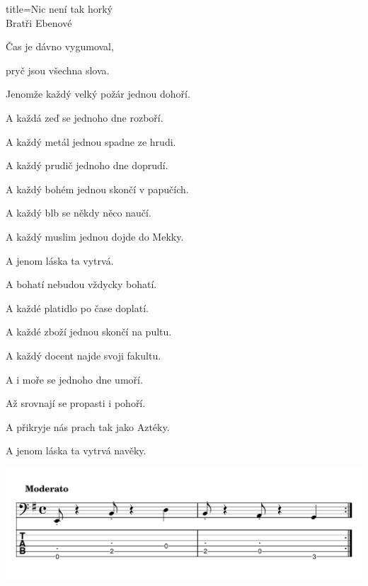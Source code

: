 \begin{song}{title=\predtitle \centering Nic není tak horký \\\large Bratři Ebenové \vspace*{-0.5cm}}
{\begin{centerjustified}
\begin{varwidth}[t]{0.6\textwidth}
Čas je dávno vygumoval,

pryč jsou všechna slova.


\sloka
Jenomže každý velký požár jednou dohoří.

A každá zeď se jednoho dne rozboří.

A každý metál jednou spadne ze hrudi.

A každý prudič jednoho dne doprudí.

A každý bohém jednou skončí v papučích.

A každý blb se někdy něco naučí.

A každý muslim jednou dojde do Mekky.

A jenom láska ta vytrvá.


\sloka
A bohatí nebudou vždycky bohatí.

A každé platidlo po čase doplatí.

A každé zboží jednou skončí na pultu.

A každý docent najde svoji fakultu.

A i moře se jednoho dne umoří.

Až srovnají se propasti i pohoří.

A přikryje nás prach tak jako Aztéky.

A jenom láska ta vytrvá navěky.

\mezera

\centering
{}


\end{varwidth}
\end{centerjustified}
}

\centering
\includegraphics[scale=\defaulttabscale]{../taby/nicnenitakhorky.pdf}

\setcounter{Slokočet}{0}
\end{song}
    

